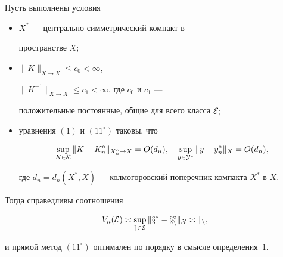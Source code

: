 \begin{lem}


Пусть выполнены условия


\begin{itemize}


\item[а)] $X^*$ --- центрально-симметрический компакт в


пространстве $X;$


\item[б)]


$\| K \|_{X\rightarrow X}\leq c_0 < \infty$,


$\| K^{-1}\|_{X\rightarrow X}\leq c_1 <\infty $, где $c_0$ и $c_1$ ---


положительные постоянные, общие для всего класса $\cal{E};$


\item[в)] уравнения $(1)$ и $(11^\circ)$ таковы, что


$$


\sup_{K\in \cal {K}} \| K-K_n^\circ\|_{X_n^\circ \rightarrow X}


=O(d_n),\quad \sup_{y\in \cal Y^*} \|y-y_n^\circ\|_{X} =O(d_n),


$$


где $d_n = d_n(X^*, X)$ --- колмогоровский поперечник компакта $X^*$ в $X$.


\end{itemize}


Тогда справедливы соотношения


\begin{equation}


V_n(\cal{E})\asymp \sup_{e\in \cal{E}} \|x^*-x_n^\circ\|_{X}


\asymp d_n,


\end{equation}


и прямой метод $(11^\circ)$ оптимален по порядку в смысле определения~$1$.


\end{lem}





